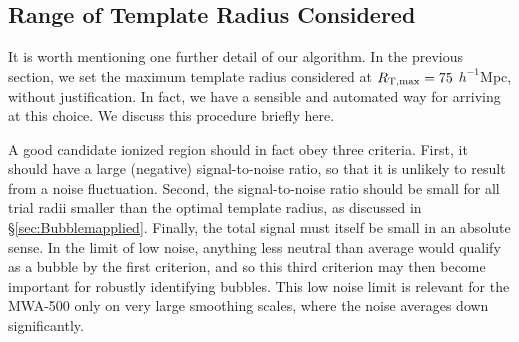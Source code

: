 \subsection{Range of Template Radius Considered} \label{sec:BubbleVaryRt}

It is worth mentioning one further detail of our algorithm. In
the previous section, we set the maximum template radius considered at
$R_{\rm T, max} = 75$ $h^{-1}$Mpc, without justification. In fact, we
have a sensible and automated way for arriving at this choice. We discuss this procedure briefly here.
 
A good candidate ionized region should in fact obey three criteria. First,
it should have a large (negative) signal-to-noise ratio, so that it is unlikely
to result from a noise fluctuation. Second, the signal-to-noise ratio should
be small for all trial radii smaller than the optimal template radius, as discussed
in \S \ref{sec:Bubblemapplied}. Finally,
the total signal must itself be
small in an absolute sense. In the limit of low noise, anything less neutral 
than average would qualify as a bubble by the first criterion, and so
this third criterion may then become important for robustly identifying bubbles.
This low noise limit is relevant for the MWA-500 only on very large
smoothing scales, where the noise averages down significantly. 

